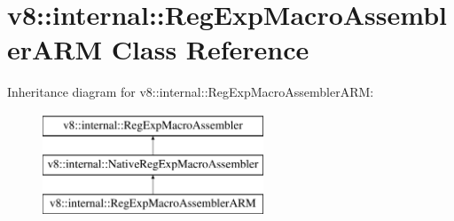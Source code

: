\hypertarget{classv8_1_1internal_1_1RegExpMacroAssemblerARM}{}\section{v8\+:\+:internal\+:\+:Reg\+Exp\+Macro\+Assembler\+A\+RM Class Reference}
\label{classv8_1_1internal_1_1RegExpMacroAssemblerARM}
Inheritance diagram for v8\+:\+:internal\+:\+:Reg\+Exp\+Macro\+Assembler\+A\+RM\+:\begin{figure}[H]
\begin{center}
\leavevmode
\includegraphics[height=3.000000cm]{classv8_1_1internal_1_1RegExpMacroAssemblerARM}
\end{center}
\end{figure}
